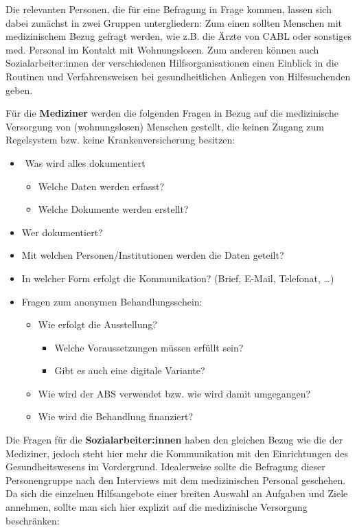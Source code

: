 Die relevanten Personen, die für eine Befragung in Frage kommen, lassen sich dabei zunächst in zwei Gruppen untergliedern: Zum einen sollten Menschen mit medizinischem Bezug gefragt werden, wie z.B. die Ärzte von CABL oder sonstiges med. Personal im Kontakt mit Wohnungslosen. Zum anderen können auch Sozialarbeiter:innen der verschiedenen Hilfsorganisationen einen Einblick in die Routinen und Verfahrensweisen bei gesundheitlichen Anliegen von Hilfesuchenden geben.

Für die \textbf{Mediziner} werden die folgenden Fragen in Bezug auf die medizinische Versorgung von (wohnungslosen) Menschen gestellt, die keinen Zugang zum Regelsystem bzw. keine Krankenversicherung besitzen:

\begin{itemize}
	\item ­	Was wird alles dokumentiert
	\begin{itemize}
		\item Welche Daten werden erfasst?
		\item Welche Dokumente werden erstellt?
	\end{itemize}
	\item Wer dokumentiert?
	\item Mit welchen Personen/Institutionen werden die Daten geteilt?
	\item In welcher Form erfolgt die Kommunikation? (Brief, E-Mail, Telefonat, …)
	\item Fragen zum anonymen Behandlungsschein:
	\begin{itemize}
		\item Wie erfolgt die Ausstellung?
		\begin{itemize}
			\item Welche Voraussetzungen müssen erfüllt sein?
			\item Gibt es auch eine digitale Variante?
		\end{itemize}
		\item Wie wird der ABS verwendet bzw. wie wird damit umgegangen?
		\item Wie wird die Behandlung finanziert?
	\end{itemize}
\end{itemize}

Die Fragen für die \textbf{Sozialarbeiter:innen} haben den gleichen Bezug wie die der Mediziner, jedoch steht hier mehr die Kommunikation mit den Einrichtungen des Gesundheitswesens im Vordergrund. Idealerweise sollte die Befragung dieser Personengruppe nach den Interviews mit dem medizinischen Personal geschehen. Da sich die einzelnen Hilfsangebote einer breiten Auswahl an Aufgaben und Ziele annehmen, sollte man sich hier explizit auf die medizinische Versorgung beschränken:

